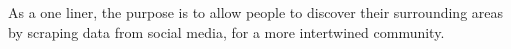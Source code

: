 \documentclass[11pt]{article}
\begin{document}
As a one liner, the purpose is to allow people to discover their surrounding areas by scraping data from social media, for a more intertwined community.




\end{document}

